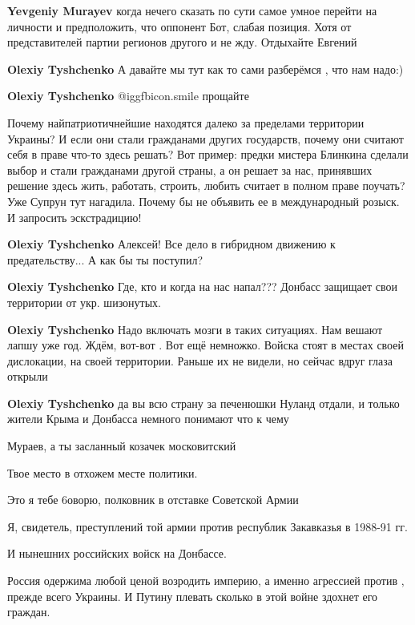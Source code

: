 \begin{itemize}
\begin{itemize}
\textbf{Yevgeniy Murayev} когда нечего сказать по сути самое умное перейти на личности и предположить, что оппонент Бот, слабая позиция. Хотя от представителей партии регионов другого и не жду. Отдыхайте Евгений

\textbf{Olexiy Tyshchenko} А давайте мы тут как то сами разберёмся , что нам надо:)

\textbf{Olexiy Tyshchenko}  @igg{fbicon.smile}  прощайте


Почему найпатриотичнейшие находятся далеко за пределами территории Украины? И
если они стали гражданами других государств, почему они считают себя в праве
что-то здесь решать? Вот пример: предки мистера Блинкина сделали выбор и стали
гражданами другой страны, а он решает за нас, принявших решение здесь жить,
работать, строить, любить считает в полном праве поучать? Уже Супрун тут
нагадила. Почему бы не объявить ее в международный розыск. И запросить
эскстрадицию!

\textbf{Olexiy Tyshchenko} Алексей! Все дело в гибридном движению к предательству... А как бы ты поступил?

\textbf{Olexiy Tyshchenko} Где, кто и когда на нас напал??? Донбасс защищает свои территории от укр. шизонутых.

\textbf{Olexiy Tyshchenko} Надо включать мозги в таких ситуациях. Нам вешают лапшу уже год. Ждём, вот-вот . Вот ещё немножко.
Войска стоят в местах своей дислокации, на своей территории. Раньше их не видели, но сейчас вдруг глаза открыли

\textbf{Olexiy Tyshchenko} да вы всю страну за печенюшки Нуланд отдали, и только жители Крыма и Донбасса немного понимают что к чему


Мураев, а ты засланный козачек московитский

Твое место в отхожем месте политики.

Это я тебе 6оворю, полковник в отставке Советской Армии

Я, свидетель, преступлений той армии против республик Закавказья в 1988-91 гг.

И нынешних российских войск на Донбассе.

Россия одержима любой ценой возродить империю, а именно агрессией против ,
прежде всего Украины. И Путину плевать сколько в этой войне здохнет его
граждан.


\end{itemize}
\end{itemize}
